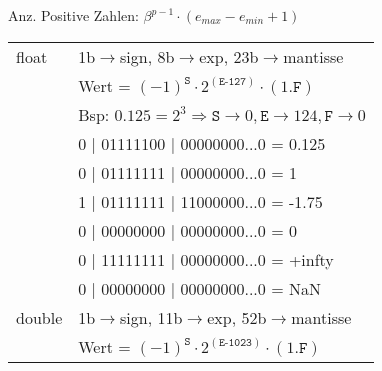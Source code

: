 Anz. Positive Zahlen: $\beta^{p-1}\cdot (e_{max}-e_{min}+1) $
\begin{center}
	\begin{tabular}{ ll } 
		float&1b$\rightarrow$sign, 8b$\rightarrow$exp, 23b$\rightarrow$mantisse\\
		&Wert = $(-1)^{\texttt{S}} \cdot 2^{(\texttt{E-127})} \cdot (1.\texttt{F})$\\
		&Bsp: $0.125 = 2^{3} \Rightarrow \texttt{S} \rightarrow 0, \texttt{E} \rightarrow 124, \texttt{F} \rightarrow 0$\\
		\hline
		 & 0 | 01111100 | 00000000...0 = 0.125\\
		 & 0 | 01111111 | 00000000...0 = 1\\
		 & 1 | 01111111 | 11000000...0 = -1.75\\
		 & 0 | 00000000 | 00000000...0 = 0\\
		 & 0 | 11111111 | 00000000...0 = +infty\\
		 & 0 | 00000000 | 00000000...0 = NaN\\
		\hline
		double& 1b$\rightarrow$sign, 11b$\rightarrow$exp, 52b$\rightarrow$mantisse\\
		& Wert = $(-1)^{\texttt{S}} \cdot 2^{(\texttt{E-1023})} \cdot (1.\texttt{F})$\\
	\end{tabular}
\end{center}















